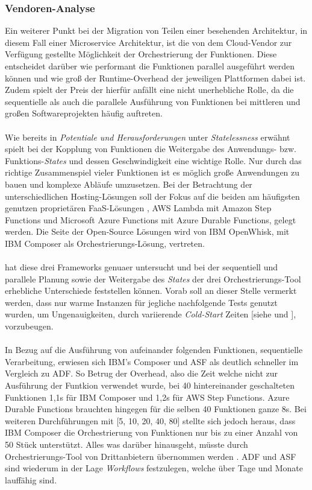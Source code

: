 \documentclass[11pt]{article}
\begin{document}
\subsubsection{Vendoren-Analyse}
Ein weiterer Punkt bei der Migration von Teilen einer besehenden Architektur, in diesem Fall einer Microservice Architektur, ist die von dem Cloud-Vendor zur Verfügung gestellte Möglichkeit der Orchestrierung der Funktionen. Diese entscheidet darüber wie performant die Funktionen parallel ausgeführt werden können und wie groß der Runtime-Overhead der jeweiligen Plattformen dabei ist. Zudem spielt der Preis der hierfür anfällt eine nicht unerhebliche Rolle, da die sequentielle als auch die parallele Ausführung von Funktionen bei mittleren und großen Softwareprojekten häufig auftreten. \\\\
Wie bereits in \textit{Potentiale und Herausforderungen} unter \textit{Statelessness} erwähnt spielt bei der Kopplung von Funktionen die Weitergabe des Anwendungs- bzw. Funktions-\textit{States} und dessen Geschwindigkeit eine wichtige Rolle. Nur durch das richtige Zusammenspiel vieler Funktionen ist es möglich große Anwendungen zu bauen und komplexe Abläufe umzusetzen. Bei der Betrachtung der unterschiedlichen Hosting-Lösungen soll der Fokus auf die beiden am häufigsten genutzen proprietären FaaS-Lösungen \cite{leitner2019mixed}, AWS Lambda mit Amazon Step Functions und Microsoft Azure Functions mit Azure Durable Functions, gelegt werden. Die Seite der Open-Source Lösungen wird von IBM OpenWhisk, mit IBM Composer als Orchestrierungs-Lösung, vertreten.\\\\
\cite{lopez2018comparison} hat diese drei Frameworks genuaer untersucht und bei der sequentiell und parallele Planung sowie der Weitergabe des \textit{States} der drei Orchestrierungs-Tool erhebliche Unterschiede feststellen können. Vorab soll an dieser Stelle vermerkt werden, dass nur \glqq warme\grqq{} Instanzen für jegliche nachfolgende Tests genutzt wurden, um Ungenauigkeiten, durch variierende \textit{Cold-Start} Zeiten [siehe \cite{manner2018cold} und \cite{jackson2018investigation}], vorzubeugen. \\\\
In Bezug auf die Ausführung von aufeinander folgenden Funktionen, sequentielle Verarbeitung, erwiesen sich IBM's Composer und ASF als deutlich schneller im Vergleich zu ADF. So Betrug der Overhead, also die Zeit welche nicht zur Ausführung der Funtkion verwendet wurde, bei 40 hintereinander geschalteten Funktionen 1,1s für IBM Composer und 1,2s für AWS Step Functions. Azure Durable Functions brauchten hingegen für die selben 40 Funktionen ganze 8s. Bei weiteren Durchführungen mit [5, 10, 20, 40, 80] stellte sich jedoch heraus, dass IBM Composer die Orchestrierung von Funktionen nur bis zu einer Anzahl von 50 Stück unterstützt. Alles was darüber hinausgeht, müsste durch Orchestrierungs-Tool von Drittanbietern übernommen werden \cite{lopez2018comparison}. ADF und ASF sind wiederum in der Lage \textit{Workflows} festzulegen, welche über Tage und Monate lauffähig sind. \\\\
\end{document}
